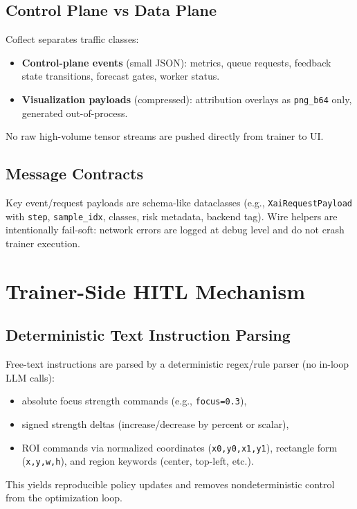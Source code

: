 \documentclass[11pt]{article}
\begin{document}
\subsection{Control Plane vs Data Plane}
Coflect separates traffic classes:
\begin{itemize}[leftmargin=1.5em]
  \item \textbf{Control-plane events} (small JSON): metrics, queue requests, feedback state transitions, forecast gates, worker status.
  \item \textbf{Visualization payloads} (compressed): attribution overlays as \texttt{png\_b64} only, generated out-of-process.
\end{itemize}

No raw high-volume tensor streams are pushed directly from trainer to UI.

\subsection{Message Contracts}
Key event/request payloads are schema-like dataclasses (e.g., \texttt{XaiRequestPayload} with \texttt{step}, \texttt{sample\_idx}, classes, risk metadata, backend tag).
Wire helpers are intentionally fail-soft: network errors are logged at debug level and do not crash trainer execution.

\section{Trainer-Side HITL Mechanism}
\subsection{Deterministic Text Instruction Parsing}
Free-text instructions are parsed by a deterministic regex/rule parser (no in-loop LLM calls):
\begin{itemize}[leftmargin=1.5em]
  \item absolute focus strength commands (e.g., \texttt{focus=0.3}),
  \item signed strength deltas (increase/decrease by percent or scalar),
  \item ROI commands via normalized coordinates (\texttt{x0,y0,x1,y1}), rectangle form (\texttt{x,y,w,h}), and region keywords (center, top-left, etc.).
\end{itemize}

This yields reproducible policy updates and removes nondeterministic control from the optimization loop.
\end{document}

